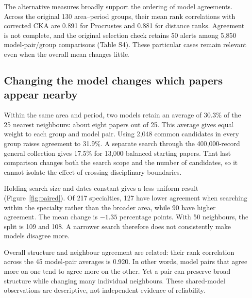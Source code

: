 \documentclass[12pt]{article}
\begin{document}
The alternative measures broadly support the ordering of model agreements. Across the original 130 area--period groups, their mean rank correlations with corrected CKA are 0.891 for Procrustes and 0.881 for distance ranks. Agreement is not complete, and the original selection check retains 50 alerts among 5,850 model-pair/group comparisons (Table S4). These particular cases remain relevant even when the overall mean changes little.

\FloatBarrier
\subsection{Changing the model changes which papers appear nearby}
Within the same area and period, two models retain an average of 30.3\% of the 25 nearest neighbours: about eight papers out of 25. This average gives equal weight to each group and model pair. Using 2,048 common candidates in every group raises agreement to 31.9\%. A separate search through the 400,000-record general collection gives 17.5\% for 13,000 balanced starting papers. That last comparison changes both the search scope and the number of candidates, so it cannot isolate the effect of crossing disciplinary boundaries.

Holding search size and dates constant gives a less uniform result (Figure~\ref{fig:paired}). Of 217 specialties, 127 have lower agreement when searching within the specialty rather than the broader area, while 90 have higher agreement. The mean change is $-1.35$ percentage points. With 50 neighbours, the split is 109 and 108. A narrower search therefore does not consistently make models disagree more.

Overall structure and neighbour agreement are related: their rank correlation across the 45 model-pair averages is 0.920. In other words, model pairs that agree more on one tend to agree more on the other. Yet a pair can preserve broad structure while changing many individual neighbours. These shared-model observations are descriptive, not independent evidence of reliability.
\end{document}

